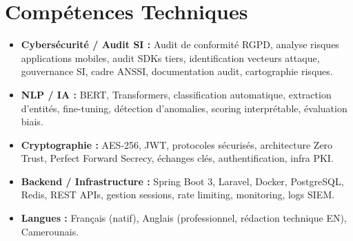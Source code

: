 \documentclass[a4paper,11pt]{article}
\begin{document}
\section{Comp\'etences Techniques}
\begin{itemize}[leftmargin=*, nosep]
    \item \small{\textbf{Cybersécurité / Audit SI :} Audit de conformité RGPD, analyse risques applications mobiles, audit SDKs tiers, identification vecteurs attaque, gouvernance SI, cadre ANSSI, documentation audit, cartographie risques.}
    \item \small{\textbf{NLP / IA :} BERT, Transformers, classification automatique, extraction d'entités, fine-tuning, détection d'anomalies, scoring interprétable, évaluation biais.}
    \item \small{\textbf{Cryptographie :} AES-256, JWT, protocoles sécurisés, architecture Zero Trust, Perfect Forward Secrecy, échanges clés, authentification, infra PKI.}
    \item \small{\textbf{Backend / Infrastructure :} Spring Boot 3, Laravel, Docker, PostgreSQL, Redis, REST APIs, gestion sessions, rate limiting, monitoring, logs SIEM.}
    \item \small{\textbf{Langues :} Français (natif), Anglais (professionnel, rédaction technique EN), Camerounais.}
\end{itemize}
\end{document}

